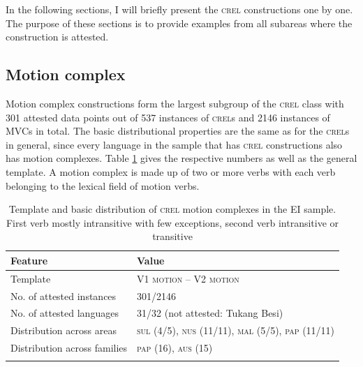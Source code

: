 In the following sections, I will briefly present the \textsc{crel} constructions one by one. The purpose of these sections is to provide examples from all subareas where the construction is attested.

\subsection{Motion complex} \label{sec:motioncomplex}

Motion complex constructions form the largest subgroup of the \textsc{crel} class with 301 attested data points out of 537 instances of \textsc{crel}s and 2146 instances of MVCs in total. The basic distributional properties are the same as for the \textsc{crel}s in general, since every language in the sample that has \textsc{crel} constructions also has motion complexes. Table \ref{table:basiccrelmotion} gives the respective numbers as well as the general template. A motion complex is made up of two or more verbs with each verb belonging to the lexical field of motion verbs.

\begin{table}
\begin{tabular}{ll}
\lsptoprule
Feature&Value\tabularnewline
\hline
Template&V1 \textsc{motion} -- V2 \textsc{motion}\tabularnewline
No. of attested instances& 301/2146 \tabularnewline
No. of attested languages& 31/32 (not attested: Tukang Besi) \tabularnewline
Distribution across areas& \textsc{sul} (4/5), \textsc{nus} (11/11), \textsc{mal} (5/5), \textsc{pap} (11/11) \tabularnewline
Distribution across families& \textsc{pap} (16), \textsc{aus} (15) \tabularnewline
\lspbottomrule
\end{tabular}
\caption[Template and basic distribution of \textsc{crel} motion complexes]{Template and basic distribution of \textsc{crel} motion complexes in the EI sample. First verb mostly intransitive with few exceptions, second verb intransitive or transitive}
\label{table:basiccrelmotion}
\end{table}

